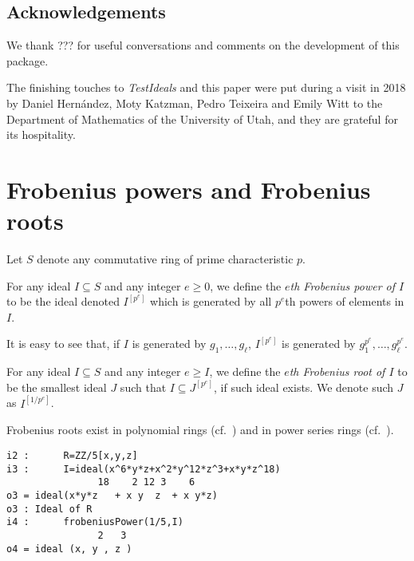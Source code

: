 \documentclass[11pt]{amsart}
\begin{document}
\subsection*{Acknowledgements}

We thank ??? for useful conversations and comments on the development of this package.

The finishing touches to \emph{TestIdeals} and this paper were put during a visit in 2018 by
Daniel Hern\'andez, Moty Katzman, Pedro Teixeira and Emily Witt to the Department of Mathematics of the University of Utah,
and they are grateful for its hospitality.


\section{Frobenius powers and Frobenius roots}\label{Section: Frobenius powers and Frobenius roots}


Let $S$ denote any commutative ring of prime characteristic $p$.

\begin{definition}
For any ideal $I\subseteq S$ and any integer $e\geq 0$, we define the \emph{$e$th Frobenius power of $I$} to be the ideal denoted $I^{[p^e]}$ which is
generated by all $p^e$th powers of elements in $I$.
\end{definition}

It is easy to see that, if $I$ is generated by $g_1, \dots, g_\ell$, $I^{[p^e]}$ is generated by $g_1^{p^e}, \dots, g_\ell^{p^e}$.


\begin{definition}
For any ideal $I\subseteq S$ and any integer $e\geq I$, we define the \emph{$e$th Frobenius root of $I$} to be the smallest ideal $J$ such that $I\subseteq J^{[p^e]}$, if such ideal exists.
We denote such $J$ as $I^{[1/p^{e}]}$.
\end{definition}

Frobenius roots exist in polynomial rings (cf.~\cite[\S 2]{BlickleMustataSmithDiscretenessAndRationalityOfFThresholds}) and in power series rings
(cf.~\cite[\S 5]{KatzmanParameterTestIdealOfCMRings}).


\begin{verbatim}
i2 :      R=ZZ/5[x,y,z]
i3 :      I=ideal(x^6*y*z+x^2*y^12*z^3+x*y*z^18)
                18    2 12 3    6
o3 = ideal(x*y*z   + x y  z  + x y*z)
o3 : Ideal of R
i4 :      frobeniusPower(1/5,I)
                2   3
o4 = ideal (x, y , z )
\end{verbatim}
\end{document}
